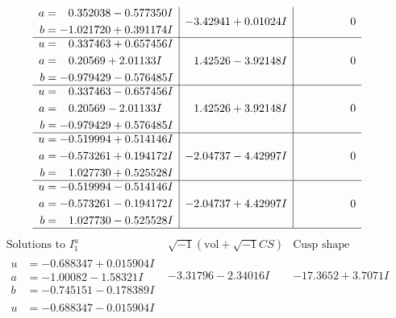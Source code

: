 \documentclass[1p]{elsarticle_modified}
\theoremstyle{definition}
\newcommand{\I}{\sqrt{-1}}
\begin{document}
$$\begin{array}{c|c|c}
\begin{aligned}
a &= \phantom{-}0.352038 - 0.577350 I \\
b &= -1.021720 + 0.391174 I\end{aligned}
 & -3.42941 + 0.01024 I & \phantom{-0.000000 } 0 \\ \hline\begin{aligned}
u &= \phantom{-}0.337463 + 0.657456 I \\
a &= \phantom{-}0.20569 + 2.01133 I \\
b &= -0.979429 - 0.576485 I\end{aligned}
 & \phantom{-}1.42526 - 3.92148 I & \phantom{-0.000000 } 0 \\ \hline\begin{aligned}
u &= \phantom{-}0.337463 - 0.657456 I \\
a &= \phantom{-}0.20569 - 2.01133 I \\
b &= -0.979429 + 0.576485 I\end{aligned}
 & \phantom{-}1.42526 + 3.92148 I & \phantom{-0.000000 } 0 \\ \hline\begin{aligned}
u &= -0.519994 + 0.514146 I \\
a &= -0.573261 + 0.194172 I \\
b &= \phantom{-}1.027730 + 0.525528 I\end{aligned}
 & -2.04737 - 4.42997 I & \phantom{-0.000000 } 0 \\ \hline\begin{aligned}
u &= -0.519994 - 0.514146 I \\
a &= -0.573261 - 0.194172 I \\
b &= \phantom{-}1.027730 - 0.525528 I\end{aligned}
 & -2.04737 + 4.42997 I & \phantom{-0.000000 } 0\\
 \hline 
 \end{array}$$\newpage$$\begin{array}{c|c|c}  
\text{Solutions to }I^u_{1}& \I (\text{vol} + \sqrt{-1}CS) & \text{Cusp shape}\\
 \hline 
\begin{aligned}
u &= -0.688347 + 0.015904 I \\
a &= -1.00082 - 1.58321 I \\
b &= -0.745151 - 0.178389 I\end{aligned}
 & -3.31796 - 2.34016 I & -17.3652 + 3.7071 I \\ \hline\begin{aligned}
u &= -0.688347 - 0.015904 I \\

\end{aligned}
\end{array}$$
\end{document}
